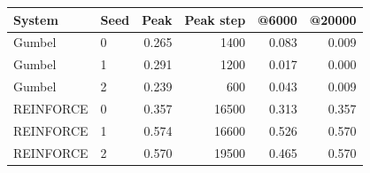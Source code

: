 \begin{tabular}{llrrrr}
\hline
System & Seed & Peak & Peak step & @6000 & @20000\\
\hline
Gumbel & 0 & 0.265 & 1400 & 0.083 & 0.009\\
Gumbel & 1 & 0.291 & 1200 & 0.017 & 0.000\\
Gumbel & 2 & 0.239 & 600 & 0.043 & 0.009\\
REINFORCE & 0 & 0.357 & 16500 & 0.313 & 0.357\\
REINFORCE & 1 & 0.574 & 16600 & 0.526 & 0.570\\
REINFORCE & 2 & 0.570 & 19500 & 0.465 & 0.570\\
\hline
\end{tabular}
